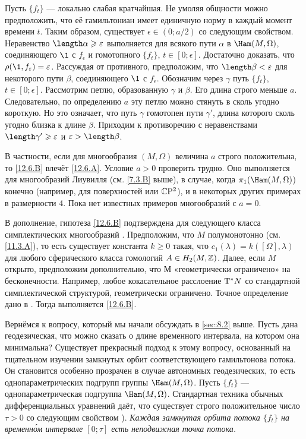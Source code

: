 Пусть $\{f_t\}$ --- локально слабая кратчайшая.
Не умоляя общности можно предположить, что её гамильтониан имеет единичную норму в каждый момент времени $t$.
Таким образом, существует $\epsilon \in (0; a/2)$ со следующим свойством.
Неравенство $\length\alpha \ge \epsilon$ выполняется для всякого пути $\alpha$ в $\Ham(M, \Omega)$, соединяющего $\1$ с $f_\epsilon$ и гомотопного $\{f_t\}$, $t\in[0; \epsilon]$.
Достаточно доказать, что $\rho(\1, f_\epsilon) = \epsilon$.
Рассуждая от противного, предположим, что $\length \beta < \epsilon$ для некоторого пути $\beta$, соединяющего $\1$ с $f_\epsilon$.
Обозначим через $\gamma$ путь $\{f_t\}$, $t\in[0; \epsilon]$.
Рассмотрим петлю, образованную $\gamma$ и $\beta$.
Его длина строго меньше $a$.
Следовательно, по определению $a$ эту петлю можно стянуть в сколь угодно короткую.
Но это означает, что путь $\gamma$ гомотопен пути $\gamma'$, длина которого сколь угодно близка к длине $\beta$.
Приходим к противоречию с неравенствами $\length \gamma' \ge\epsilon$ и $\epsilon > \length \beta$.
\qeds

В частности, если для многообразия $(M,\Omega)$ величина $a$ строго положительна, то \ref{12.6.B} влечёт \ref{12.6.A}.
Условие $a > 0$ проверить трудно.
Оно выполняется для многообразий Лиувилля (см. \ref{7.3.B} выше), в случае, когда $\pi_1(\Ham(M, \Omega)$) конечно (например, для поверхностей или $\mathbb{C}\mathrm{P}^2$), и в некоторых других примерах в размерности 4.
Пока нет известных примеров многообразий с $a = 0$.

В дополнение, гипотеза \ref{12.6.B} подтверждена для следующего класса симплектических многообразий \cite{LM2}.
Предположим, что $M$ полумонотонно (см. \ref{11.3.A}), то есть существует константа $k \ge 0$ такая, что $c_1(\lambda) = k([\Omega],\lambda)$ для любого сферического класса гомологий $A \in H_2 (M, \mathbb{Z})$.
Далее, если $M$ открыто, предположим дополнительно, что $М$ «геометрически ограничено» на бесконечности.
Например, любое кокасательное расслоение $\mathrm{T}^\ast N$ со стандартной симплектической структурой, геометрически ограничено.
Точное определение дано в \cite{AL}.
Тогда выполняется \ref{12.6.B}.

Вернёмся к вопросу, который мы начали обсуждать в \ref{sec:8.2} выше.
Пусть дана геодезическая, что можно сказать о длине временного интервала, на котором она минимальна?
Существует прекрасный подход к этому вопросу, основанный на тщательном изучении замкнутых орбит соответствующего гамильтонова потока.
Он становится особенно прозрачен в случае автономных геодезических, то есть однопараметрических подгрупп группы $\Ham(M, \Omega)$.
Пусть $\{f_t\}$ --- однопараметрическая подгруппа $\Ham(M, \Omega)$.
Стандартная техника обычных дифференциальных уравнений даёт, что существует строго положительное число $\tau > 0$ со следующим свойством \cite[Sec. 5.7]{HZ}).
\emph{Каждая замкнутая орбита потока $\{f_t\}$ на временн\'{о}м интервале $[0; \tau]$ есть неподвижная точка потока.}

